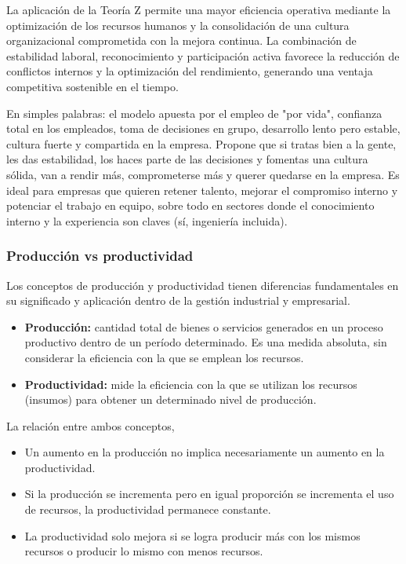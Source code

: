 \documentclass[a4paper,oneside,11pt]{article}
\begin{document}
La aplicación de la Teoría Z permite una mayor eficiencia operativa mediante la optimización de los recursos humanos y la consolidación de una cultura organizacional comprometida con la mejora continua. La combinación de estabilidad laboral, reconocimiento y participación activa favorece la reducción de conflictos internos y la optimización del rendimiento, generando una ventaja competitiva sostenible en el tiempo.

En simples palabras: el modelo apuesta por el empleo de "por vida", confianza total en los empleados, toma de decisiones en grupo, desarrollo lento pero estable, cultura fuerte y compartida en la empresa. Propone que si tratas bien a la gente, les das estabilidad, los haces parte de las decisiones y fomentas una cultura sólida, van a rendir más, comprometerse más y querer quedarse en la empresa. Es ideal para empresas que quieren retener talento, mejorar el compromiso interno y potenciar el trabajo en equipo, sobre todo en sectores donde el conocimiento interno y la experiencia son claves (sí, ingeniería incluida).

\subsubsection{Producción vs productividad}

Los conceptos de producción y productividad tienen diferencias fundamentales en su significado y aplicación dentro de la gestión industrial y empresarial.

\begin{itemize}
    \item \textbf{Producción:} cantidad total de bienes o servicios generados en un proceso productivo dentro de un período determinado. Es una medida absoluta, sin considerar la eficiencia con la que se emplean los recursos.

    \item \textbf{Productividad:} mide la eficiencia con la que se utilizan los recursos (insumos) para obtener un determinado nivel de producción.
\end{itemize}

La relación entre ambos conceptos,

\begin{itemize}
    \item Un aumento en la producción no implica necesariamente un aumento en la productividad.
    \item Si la producción se incrementa pero en igual proporción se incrementa el uso de recursos, la productividad permanece constante.
    \item La productividad solo mejora si se logra producir más con los mismos recursos o producir lo mismo con menos recursos.
\end{itemize}
\end{document}
